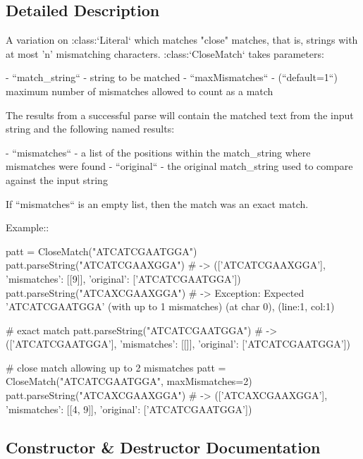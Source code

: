 \subsection{Detailed Description}
\begin{DoxyVerb}A variation on :class:`Literal` which matches "close" matches,
that is, strings with at most 'n' mismatching characters.
:class:`CloseMatch` takes parameters:

 - ``match_string`` - string to be matched
 - ``maxMismatches`` - (``default=1``) maximum number of
   mismatches allowed to count as a match

The results from a successful parse will contain the matched text
from the input string and the following named results:

 - ``mismatches`` - a list of the positions within the
   match_string where mismatches were found
 - ``original`` - the original match_string used to compare
   against the input string

If ``mismatches`` is an empty list, then the match was an exact
match.

Example::

    patt = CloseMatch("ATCATCGAATGGA")
    patt.parseString("ATCATCGAAXGGA") # -> (['ATCATCGAAXGGA'], {'mismatches': [[9]], 'original': ['ATCATCGAATGGA']})
    patt.parseString("ATCAXCGAAXGGA") # -> Exception: Expected 'ATCATCGAATGGA' (with up to 1 mismatches) (at char 0), (line:1, col:1)

    # exact match
    patt.parseString("ATCATCGAATGGA") # -> (['ATCATCGAATGGA'], {'mismatches': [[]], 'original': ['ATCATCGAATGGA']})

    # close match allowing up to 2 mismatches
    patt = CloseMatch("ATCATCGAATGGA", maxMismatches=2)
    patt.parseString("ATCAXCGAAXGGA") # -> (['ATCAXCGAAXGGA'], {'mismatches': [[4, 9]], 'original': ['ATCATCGAATGGA']})
\end{DoxyVerb}
 

\subsection{Constructor \& Destructor Documentation}
\mbox{\label{classpip_1_1__vendor_1_1pyparsing_1_1CloseMatch_a13cd5d95fb3b9acd7c319e23bf2eb9a3}} 
